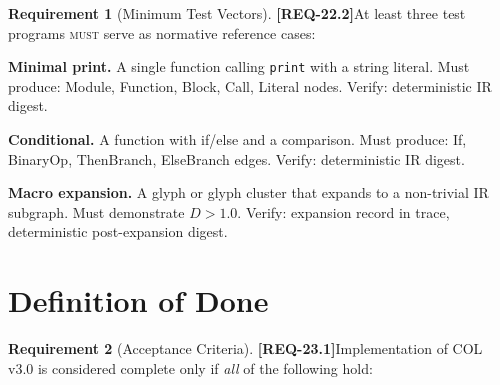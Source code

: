 \documentclass[11pt,a4paper,twoside]{article}
\theoremstyle{definition}
\newtheorem{requirement}{Requirement}[section]
\theoremstyle{remark}
\newcommand{\req}[1]{\textbf{\textcolor{reqred}{[REQ-#1]}}}
\newcommand{\must}{\textsc{must}}
\begin{document}
\begin{requirement}[Minimum Test Vectors]
\label{req:test-vectors}
\req{22.2}\quad At least three test programs \must{} serve as normative reference cases:
\end{requirement}

\begin{description}[leftmargin=2cm]
  \item[TV1] \textbf{Minimal print.} A single function calling \texttt{print} with a string literal. Must produce: Module, Function, Block, Call, Literal nodes. Verify: deterministic IR digest.

  \item[TV2] \textbf{Conditional.} A function with if/else and a comparison. Must produce: If, BinaryOp, ThenBranch, ElseBranch edges. Verify: deterministic IR digest.

  \item[TV3] \textbf{Macro expansion.} A glyph or glyph cluster that expands to a non-trivial IR subgraph. Must demonstrate $D > 1.0$. Verify: expansion record in trace, deterministic post-expansion digest.
\end{description}



\section{Definition of Done}
\label{sec:dod}

\begin{requirement}[Acceptance Criteria]
\label{req:dod}
\req{23.1}\quad Implementation of COL v3.0 is considered complete only if \emph{all} of the following hold:
\end{requirement}
\end{document}
